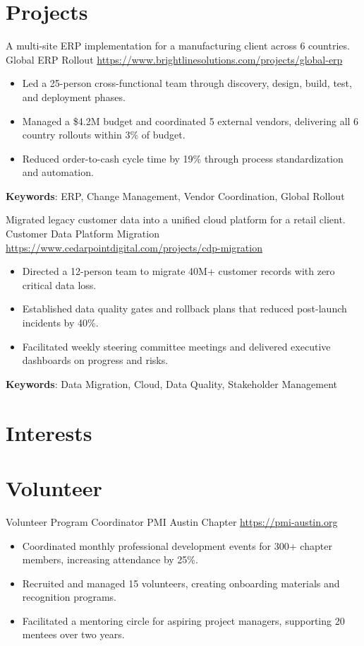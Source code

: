 \documentclass[a4paper, serif, 10pt]{moderncv}
\begin{document}
\section{Projects}

        {A multi-site ERP implementation for a manufacturing client across 6 countries.}
        {Global ERP Rollout}
        {\url{https://www.brightlinesolutions.com/projects/global-erp}}
        {}
        {\begin{itemize}
\item Led a 25-person cross-functional team through discovery, design, build, test, and deployment phases.
\item Managed a \$4.2M budget and coordinated 5 external vendors, delivering all 6 country rollouts within 3\% of budget.
\item Reduced order-to-cash cycle time by 19\% through process standardization and automation.
\end{itemize}
\textbf{Keywords}: ERP, Change Management, Vendor Coordination, Global Rollout}

        {Migrated legacy customer data into a unified cloud platform for a retail client.}
        {Customer Data Platform Migration}
        {\url{https://www.cedarpointdigital.com/projects/cdp-migration}}
        {}
        {\begin{itemize}
\item Directed a 12-person team to migrate 40M+ customer records with zero critical data loss.
\item Established data quality gates and rollback plans that reduced post-launch incidents by 40\%.
\item Facilitated weekly steering committee meetings and delivered executive dashboards on progress and risks.
\end{itemize}
\textbf{Keywords}: Data Migration, Cloud, Data Quality, Stakeholder Management}
\section{Interests}

\section{Volunteer}

        {Volunteer Program Coordinator}
        {PMI Austin Chapter}
        {\url{https://pmi-austin.org}}
        {}
        {\begin{itemize}
\item Coordinated monthly professional development events for 300+ chapter members, increasing attendance by 25\%.
\item Recruited and managed 15 volunteers, creating onboarding materials and recognition programs.
\item Facilitated a mentoring circle for aspiring project managers, supporting 20 mentees over two years.
\end{itemize}}
    
\end{document}
